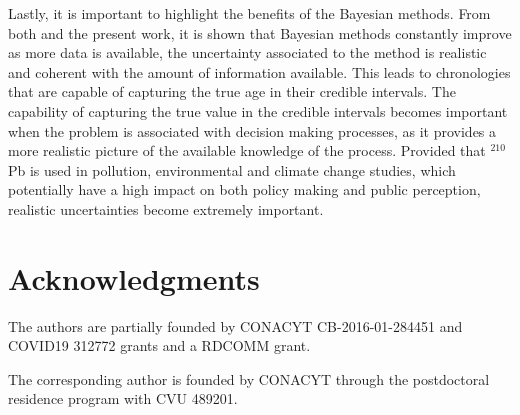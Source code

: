 \documentclass [10pt] {article}
\begin{document}
Lastly, it is important to highlight the benefits of the Bayesian methods.
From both \citet{Blaauw2018} and the present work, it is shown that Bayesian methods constantly improve as more data is available, the uncertainty associated to the method is realistic and coherent with the amount of information available. This leads to chronologies that are capable of capturing the true age in their credible intervals. 
The capability of capturing the true value in the credible intervals becomes important when the problem is associated with decision making processes, as it provides a more realistic picture of the available knowledge of the process. 
Provided that $^{210}$Pb is used in pollution, environmental and climate change studies, which potentially have a high impact on both policy making and public perception, realistic uncertainties become extremely important. 



\section{Acknowledgments}

The authors are partially founded by CONACYT CB-2016-01-284451 and COVID19 312772 grants and a RDCOMM grant.

The corresponding author is founded by CONACYT through the postdoctoral residence program with CVU  489201.


\end{document}
